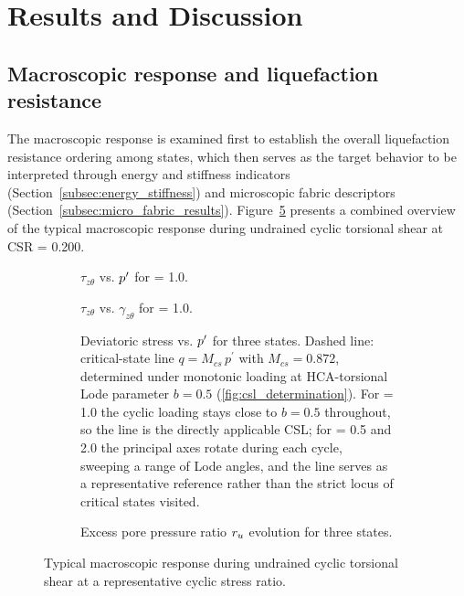 \section{Results and Discussion}
\label{sec:results}

\subsection{Macroscopic response and liquefaction resistance}
\label{subsec:macro_response}

The macroscopic response is examined first to establish the overall liquefaction resistance ordering among \Kzero{} states, which then serves as the target behavior to be interpreted through energy and stiffness indicators (Section~\ref{subsec:energy_stiffness}) and microscopic fabric descriptors (Section~\ref{subsec:micro_fabric_results}). Figure~\ref{fig:macro_response} presents a combined overview of the typical macroscopic response during undrained cyclic torsional shear at CSR = 0.200.

\begin{figure}[t]
  \centering
  \begin{subfigure}[t]{0.48\textwidth}
    \centering
    \caption{$\tau_{z\theta}$ vs. $p^\prime$ for \Kzero{} = 1.0.}
    \label{fig:macro_response_a}
  \end{subfigure}
  \hfill
  \begin{subfigure}[t]{0.48\textwidth}
    \centering
    \caption{$\tau_{z\theta}$ vs. $\gamma_{z\theta}$ for \Kzero{} = 1.0.}
    \label{fig:macro_response_b}
  \end{subfigure}

  \vspace{0.5em}

  \begin{subfigure}[t]{0.48\textwidth}
    \centering
    \caption{Deviatoric stress vs. $p^\prime$ for three \Kzero{} states. Dashed line: critical-state line $q = M_{cs}\,p^{\prime}$ with $M_{cs} = 0.872$, determined under monotonic loading at HCA-torsional Lode parameter $b = 0.5$ (\cref{fig:csl_determination}). For \Kzero{} = 1.0 the cyclic loading stays close to $b = 0.5$ throughout, so the line is the directly applicable CSL; for \Kzero{} = 0.5 and 2.0 the principal axes rotate during each cycle, sweeping a range of Lode angles, and the line serves as a representative reference rather than the strict locus of critical states visited.}
    \label{fig:macro_response_c}
  \end{subfigure}
  \hfill
  \begin{subfigure}[t]{0.48\textwidth}
    \centering
    \caption{Excess pore pressure ratio $r_u$ evolution for three \Kzero{} states.}
    \label{fig:macro_response_d}
  \end{subfigure}
  \caption{Typical macroscopic response during undrained cyclic torsional shear at a representative cyclic stress ratio.}
  \label{fig:macro_response}
\end{figure}

